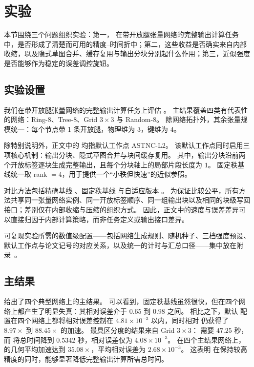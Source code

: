 \section{实验}

本节围绕三个问题组织实验：第一，\ours{} 在带开放腿张量网络的完整输出计算任务中，是否形成了清楚而可用的精度--时间折中；第二，这些收益是否确实来自内部收缩，以及隐式草图合并、缓存复用与输出分块分别起什么作用；第三，近似强度是否能够作为稳定的误差调控旋钮。

\subsection{实验设置}

我们在带开放腿张量网络的完整输出计算任务上评估 \ours{}。
主结果覆盖四类有代表性的网络：Ring-8、Tree-8、Grid $3\times 3$ 与 Random-8。
除网络拓扑外，其余张量规模统一：每个节点带 1 条开放腿，物理维为 $3$，键维为 $4$。

除特别说明外，正文中的 \ours{} 均指默认工作点 \textsf{ASTNC-L2}。
该默认工作点同时启用三项核心机制：输出分块、隐式草图合并与块间缓存复用。
其中，输出分块沿前两个开放标签逐块生成完整输出，且每个分块轴上的局部片段长度为 $1$。
固定秩基线统一取 rank $=4$，用于提供一个“小秩但快速”的近似参照。

对比方法包括精确基线 \exact{}、固定秩基线 \fixrank{} 与自适应版本 \ours{}。
为保证比较公平，所有方法共享同一张量网络实例、同一开放标签顺序、同一组输出块以及相同的块级写回接口；差别仅在内部收缩与压缩的组织方式。
因此，正文中的速度与误差差异可以直接归因于内部计算策略，而非任务定义或输出接口差异。

可复现实验所需的数值级配置——包括网络生成规则、随机种子、三档强度预设、默认工作点与论文记号的对应关系，以及统一的计时与汇总口径——集中放在附录~。

\subsection{主结果}

 给出了四个典型网络上的主结果。
可以看到，固定秩基线虽然很快，但在四个网络上都产生了明显失真：其相对误差介于 $0.65$ 到 $0.98$ 之间。
相比之下，默认 \ours{} 配置在四个网络上都将相对误差控制在 $4.81\times 10^{-3}$ 以内，同时相对 \exact{} 仍获得了 $8.97\times$ 到 $88.45\times$ 的加速。
最具区分度的结果来自 Grid $3\times 3$：\exact{} 需要 $47.25$ 秒，而 \ours{} 将总时间降到 $0.5342$ 秒，相对误差仅为 $4.08\times 10^{-3}$。
在四个主结果网络上，\ours{} 的几何平均加速达到 $35.08\times$，平均相对误差为 $2.68\times 10^{-3}$。
这表明 \ours{} 在保持较高精度的同时，能够显著降低完整输出计算所需总时间。

